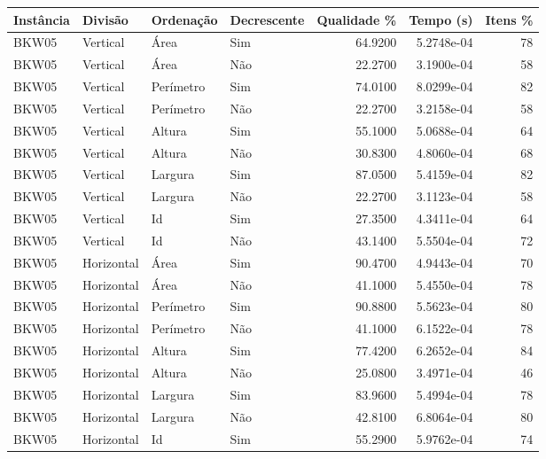 \begin{tabular}{llllrrr}
\hline
Instância & Divisão     & Ordenação & Decrescente & Qualidade \% & Tempo (s)  & Itens \% \\
\hline
BKW05     & Vertical    & Área      & Sim         & 64.9200      & 5.2748e-04 & 78       \\
BKW05     & Vertical    & Área      & Não         & 22.2700      & 3.1900e-04 & 58       \\
BKW05     & Vertical    & Perímetro & Sim         & 74.0100      & 8.0299e-04 & 82       \\
BKW05     & Vertical    & Perímetro & Não         & 22.2700      & 3.2158e-04 & 58       \\
BKW05     & Vertical    & Altura    & Sim         & 55.1000      & 5.0688e-04 & 64       \\
BKW05     & Vertical    & Altura    & Não         & 30.8300      & 4.8060e-04 & 68       \\
BKW05     & Vertical    & Largura   & Sim         & 87.0500      & 5.4159e-04 & 82       \\
BKW05     & Vertical    & Largura   & Não         & 22.2700      & 3.1123e-04 & 58       \\
BKW05     & Vertical    & Id        & Sim         & 27.3500      & 4.3411e-04 & 64       \\
BKW05     & Vertical    & Id        & Não         & 43.1400      & 5.5504e-04 & 72       \\
BKW05     & Horizontal  & Área      & Sim         & 90.4700      & 4.9443e-04 & 70       \\
BKW05     & Horizontal  & Área      & Não         & 41.1000      & 5.4550e-04 & 78       \\
BKW05     & Horizontal  & Perímetro & Sim         & 90.8800      & 5.5623e-04 & 80       \\
BKW05     & Horizontal  & Perímetro & Não         & 41.1000      & 6.1522e-04 & 78       \\
BKW05     & Horizontal  & Altura    & Sim         & 77.4200      & 6.2652e-04 & 84       \\
BKW05     & Horizontal  & Altura    & Não         & 25.0800      & 3.4971e-04 & 46       \\
BKW05     & Horizontal  & Largura   & Sim         & 83.9600      & 5.4994e-04 & 78       \\
BKW05     & Horizontal  & Largura   & Não         & 42.8100      & 6.8064e-04 & 80       \\
BKW05     & Horizontal  & Id        & Sim         & 55.2900      & 5.9762e-04 & 74       \\

\end{tabular}
